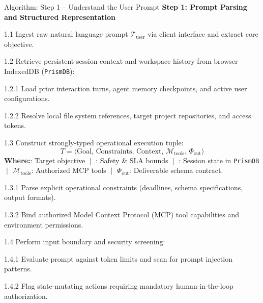 \documentclass[aspectratio=169,10pt]{beamer}
\newenvironment{algolist}{%
  \begin{list}{}{%
    \setlength{\labelwidth}{1.9em}%
    \setlength{\leftmargin}{2.1em}%
    \setlength{\itemindent}{0pt}%
    \setlength{\labelsep}{0.45em}%
    \setlength{\itemsep}{0.28em}%
    \setlength{\parsep}{0pt}%
    \setlength{\topsep}{0.1em}%
    \renewcommand{\makelabel}[1]{\textbf{\color{lavenderDark}##1}}%
  }\small%
}{\end{list}}
\newenvironment{algosublist}{%
  \begin{list}{}{%
    \setlength{\labelwidth}{2.4em}%
    \setlength{\leftmargin}{2.8em}%
    \setlength{\itemindent}{0pt}%
    \setlength{\labelsep}{0.4em}%
    \setlength{\itemsep}{0.14em}%
    \setlength{\parsep}{0pt}%
    \setlength{\topsep}{0.1em}%
    \renewcommand{\makelabel}[1]{\textbf{\color{lavenderMedium}##1}}%
  }\small%
}{\end{list}}
\begin{document}
\begin{frame}[t]{Algorithm: Step 1 -- Understand the User Prompt}
\vspace{-0.15em}
{\large\bfseries\color{lavenderDark}Step 1: Prompt Parsing and Structured Representation}
\vspace{0.15em}

\begin{algolist}
  \item[1.1] Ingest raw natural language prompt $\mathcal{T}_{\text{user}}$ via client interface and extract core objective.
  \item[1.2] Retrieve persistent session context and workspace history from browser IndexedDB (\texttt{PrismDB}):
    \begin{algosublist}
      \item[1.2.1] Load prior interaction turns, agent memory checkpoints, and active user configurations.
      \item[1.2.2] Resolve local file system references, target project repositories, and access tokens.
    \end{algosublist}
  \item[1.3] Construct strongly-typed operational execution tuple:
    \vspace{-0.2em}
    $$T = \langle \text{Goal}, \, \text{Constraints}, \, \text{Context}, \, \mathcal{M}_{\text{tools}}, \, \Phi_{\text{out}} \rangle$$
    \vspace{-0.2em}
    {\footnotesize\color{prismDark}%
      \textbf{\color{lavenderDark}Where:}\enspace {}: Target objective $\;\vert\;$ : Safety \& SLA bounds $\;\vert\;$ : Session state in \texttt{PrismDB} $\;\vert\;$ $\mathcal{M}_{\text{tools}}$: Authorized MCP tools $\;\vert\;$ $\Phi_{\text{out}}$: Deliverable schema contract.}
    \vspace{0.15em}
    \begin{algosublist}
      \item[1.3.1] Parse explicit operational constraints (deadlines, schema specifications, output formats).
      \item[1.3.2] Bind authorized Model Context Protocol (MCP) tool capabilities and environment permissions.
    \end{algosublist}
  \item[1.4] Perform input boundary and security screening:
    \begin{algosublist}
      \item[1.4.1] Evaluate prompt against token limits and scan for prompt injection patterns.
      \item[1.4.2] Flag state-mutating actions requiring mandatory human-in-the-loop authorization.
    \end{algosublist}
\end{algolist}
\end{frame}
\end{document}
